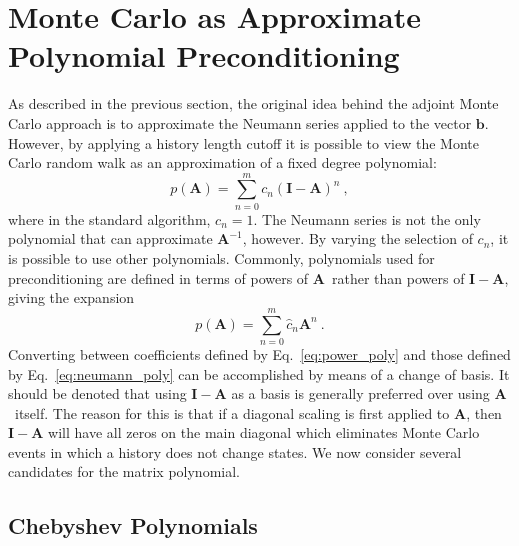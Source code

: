 \documentclass[10pt]{article}
\newcommand{\bb}{\ensuremath{\mathbf{b}}}
\newcommand{\bA}{\ensuremath{\mathbf{A}}}
\newcommand{\bI}{\ensuremath{\mathbf{I}}}
\begin{document}
\section{Monte Carlo as Approximate Polynomial Preconditioning}
\label{sec:polynomial_prec}

As described in the previous section, the original idea behind
the adjoint Monte Carlo approach is to approximate the
Neumann series applied to the vector \bb.
However, by applying a history length cutoff it is possible to
view the Monte Carlo random walk as an approximation of a
fixed degree polynomial:
\begin{equation}
p(\bA) = \sum_{n=0}^{m} c_n \left( \bI - \bA \right)^n \:, \label{eq:neumann_poly}
\end{equation}
where in the standard algorithm, $c_n=1$.
The Neumann series is not the only polynomial that can approximate
$\bA^{-1}$, however.  By varying the selection of $c_n$, it is
possible to use other polynomials.  Commonly, polynomials used
for preconditioning are defined in terms of powers of \bA\ rather
than powers of $\bI-\bA$, giving the expansion
\begin{equation}
p(\bA) = \sum_{n=0}^{m} \hat{c}_n \bA^n \:. \label{eq:power_poly}
\end{equation}
Converting between coefficients defined by Eq.~\eqref{eq:power_poly}
and those defined by Eq.~\eqref{eq:neumann_poly} can be
accomplished by means of a change of basis.  It should be denoted
that using $\bI - \bA$ as a basis is generally preferred over using
\bA\ itself.  The reason for this is that if a diagonal scaling
is first applied to \bA, then $\bI-\bA$ will have all zeros
on the main diagonal which eliminates Monte Carlo events in which
a history does not change states.
We now consider several candidates for the matrix polynomial.

\subsection{Chebyshev Polynomials}
\label{subsec:chebyshev}
\end{document}
